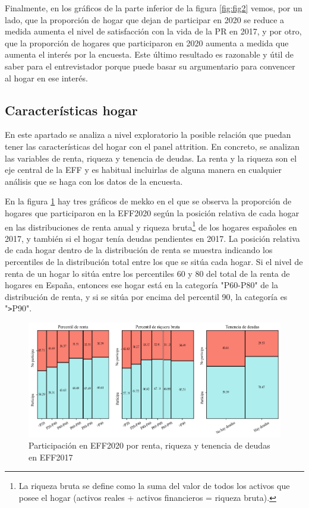 Finalmente, en los gráficos de la parte inferior de la figura \ref{fig:fig2} vemos, por un lado, que la proporción de hogar que dejan de participar en 2020 se reduce a medida aumenta el nivel de satisfacción con la vida de la PR en 2017, y por otro, que la proporción de hogares que participaron en 2020 aumenta a medida que aumenta el interés por la encuesta. Este último resultado es razonable y útil de saber para el entrevistador porque puede basar su argumentario para convencer al hogar en ese interés.

\subsection*{Características hogar}

En este apartado se analiza a nivel exploratorio la posible relación que puedan tener las características del hogar con el panel attrition. En concreto, se analizan las variables de renta, riqueza y tenencia de deudas. La renta y la riqueza son el eje central de la EFF y es habitual incluirlas de alguna manera en cualquier análisis que se haga con los datos de la encuesta.

En la figura \ref{fig:fig3} hay tres gráficos de mekko en el que se observa la proporción de hogares que participaron en la EFF2020 según la posición relativa de cada hogar en las distribuciones de renta anual y riqueza bruta\footnote{La riqueza bruta se define como la suma del valor de todos los activos que posee el hogar (activos reales + activos financieros = riqueza bruta).} de los hogares españoles en 2017, y también si el hogar tenía deudas pendientes en 2017. La posición relativa de cada hogar dentro de la distribución de renta se muestra indicando los percentiles de la distribución total entre los que se sitúa cada hogar. Si el nivel de renta de un hogar lo sitúa entre los percentiles 60 y 80 del total de la renta de hogares en España, entonces ese hogar está en la categoría "P60-P80" de la distribución de renta, y si se sitúa por encima del percentil 90, la categoría es "\verb|>|P90".

\begin{figure}[ht]
	\centering
	\includegraphics[width=1\textwidth]{figs/figure3.png}
	\caption{Participación en EFF2020 por renta, riqueza y tenencia de deudas en EFF2017}
	\label{fig:fig3}
\end{figure}

